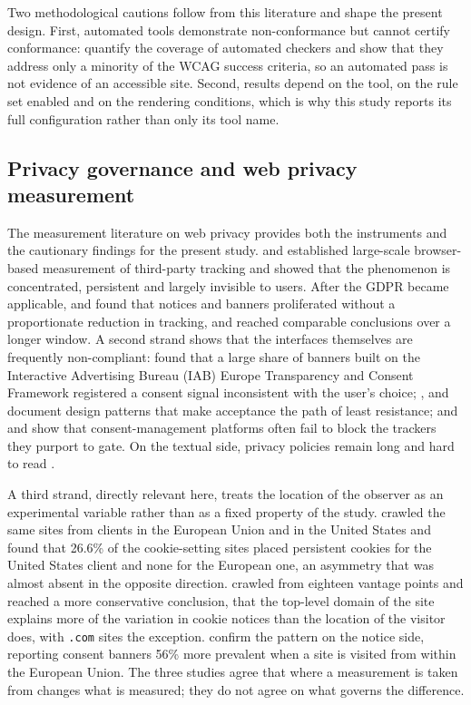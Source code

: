 \documentclass[]{interact}
\begin{document}
Two methodological cautions follow from this literature and shape the present design. First, automated tools demonstrate non-conformance but cannot certify conformance: \citet{fischer2025coverage} quantify the coverage of automated checkers and show that they address only a minority of the WCAG success criteria, so an automated pass is not evidence of an accessible site. Second, results depend on the tool, on the rule set enabled and on the rendering conditions, which is why this study reports its full configuration rather than only its tool name.

\subsection{Privacy governance and web privacy measurement}\label{sec:related-privacy}

The measurement literature on web privacy provides both the instruments and the cautionary findings for the present study. \citet{libert2015exposing} and \citet{englehardt2016online} established large-scale browser-based measurement of third-party tracking and showed that the phenomenon is concentrated, persistent and largely invisible to users. After the GDPR became applicable, \citet{degeling2019value} and \citet{trevisan2019four} found that notices and banners proliferated without a proportionate reduction in tracking, and \citet{kretschmer2021cookie} reached comparable conclusions over a longer window. A second strand shows that the interfaces themselves are frequently non-compliant: \citet{matte2020cookie} found that a large share of banners built on the Interactive Advertising Bureau (IAB) Europe Transparency and Consent Framework registered a consent signal inconsistent with the user's choice; \citet{nouwens2020dark}, \citet{gray2021dark} and \citet{habib2022okay} document design patterns that make acceptance the path of least resistance; and \citet{sanchezrola2019can} and \citet{bollinger2022automating} show that consent-management platforms often fail to block the trackers they purport to gate. On the textual side, privacy policies remain long and hard to read \citep{fabian2017largescale,belcheva2023understanding}.

A third strand, directly relevant here, treats the location of the observer as an experimental variable rather than as a fixed property of the study. \citet{dabrowski2019measuring} crawled the same sites from clients in the European Union and in the United States and found that 26.6\% of the cookie-setting sites placed persistent cookies for the United States client and none for the European one, an asymmetry that was almost absent in the opposite direction. \citet{vaneijk2019impact} crawled from eighteen vantage points and reached a more conservative conclusion, that the top-level domain of the site explains more of the variation in cookie notices than the location of the visitor does, with \texttt{.com} sites the exception. \citet{rasaii2023exploring} confirm the pattern on the notice side, reporting consent banners 56\% more prevalent when a site is visited from within the European Union. The three studies agree that where a measurement is taken from changes what is measured; they do not agree on what governs the difference.
\end{document}
